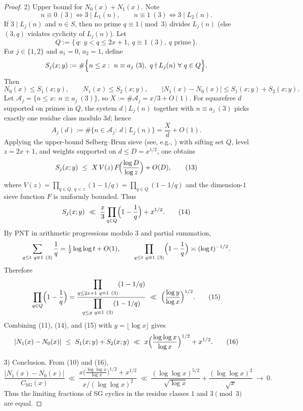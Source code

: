 \begin{proof}
2) Upper bound for $N_0(x)+N_1(x)$. Note
$$n\equiv0\ (3)\iff 3\mid L_1(n),\qquad n\equiv1\ (3)\iff 3\mid L_2(n).$$
If $3\mid L_j(n)$ and $n\in S$, then no prime $q\equiv1\pmod3$ divides $L_j(n)$ (else $(3,q)$ violates cyclicity of $L_j(n)$). Let
$$Q:=\{\,q:\ y<q\le 2x+1,\ q\equiv1\ (3),\ q\text{ prime}\,\}.$$
For $j\in\{1,2\}$ and $a_1=0$, $a_2=1$, define
$$S_j(x;y):=\#\Bigl\{n\le x:\ n\equiv a_j\ (3),\ q\nmid L_j(n)\ \forall\ q\in Q\Bigr\}.$$
Then
$$N_0(x)\le S_1(x;y),\qquad N_1(x)\le S_2(x;y),\qquad |N_1(x)-N_0(x)|\le S_1(x;y)+S_2(x;y).\tag{11}$$
Let $\mathcal A_j=\{n\le x:\ n\equiv a_j\ (3)\}$, so $X:=\#\mathcal A_j=x/3+O(1)$. For squarefree $d$ supported on primes in $Q$, the system $d\mid L_j(n)$ together with $n\equiv a_j\ (3)$ picks exactly one residue class modulo $3d$; hence
$$A_j(d):=\#\{n\in\mathcal A_j:\ d\mid L_j(n)\}=\frac{X}{d}+O(1).\tag{12}$$
Applying the upper-bound Selberg--Brun sieve (see, e.g., \cite{HalRich1974,IK2004}) with sifting set $Q$, level $z=2x+1$, and weights supported on $d\le D=x^{1/2}$, one obtains
$$S_j(x;y)\ \le\ X\,V(z)\,F\!\Bigl(\frac{\log D}{\log z}\Bigr)+O(D),\tag{13}$$
where $V(z)=\prod_{q\in Q,\ q<z}(1-1/q)=\prod_{q\in Q}(1-1/q)$ and the dimension-$1$ sieve function $F$ is uniformly bounded. Thus
$$S_j(x;y)\ \ll\ \frac{x}{3}\prod_{q\in Q}\Bigl(1-\frac1q\Bigr)+x^{1/2}.\tag{14}$$
By PNT in arithmetic progressions modulo $3$ and partial summation,
$$\sum_{\substack{q\le t\ q\equiv1\ (3)}}\frac1q=\tfrac12\log\log t+O(1),\qquad \prod_{\substack{q\le t\ q\equiv1\ (3)}}\Bigl(1-\frac1q\Bigr)\asymp (\log t)^{-1/2}.$$
Therefore
$$\prod_{q\in Q}\Bigl(1-\frac1q\Bigr)=\frac{\displaystyle\prod_{\substack{q\le 2x+1\ q\equiv1\ (3)}}(1-1/q)}{\displaystyle\prod_{\substack{q\le y\ q\equiv1\ (3)}}(1-1/q)}\ \ll\ \Bigl(\frac{\log y}{\log x}\Bigr)^{1/2}.\tag{15}$$
Combining (11), (14), and (15) with $y=\lfloor\log x\rfloor$ gives
$$|N_1(x)-N_0(x)|\ \le\ S_1(x;y)+S_2(x;y)\ \ll\ x\Bigl(\frac{\log\log x}{\log x}\Bigr)^{1/2}+x^{1/2}.\tag{16}$$

3) Conclusion. From (10) and (16),
$$\frac{|N_1(x)-N_0(x)|}{C_{\mathrm{SG}}(x)}\ \ll\ \frac{x\bigl(\tfrac{\log\log x}{\log x}\bigr)^{1/2}+x^{1/2}}{x/(\log\log x)^2}\ \ll\ \frac{(\log\log x)^{5/2}}{\sqrt{\log x}}+\frac{(\log\log x)^2}{\sqrt{x}}\ \to\ 0.$$
Thus the limiting fractions of SG cyclics in the residue classes $1$ and $3\pmod3$ are equal. 
\end{proof}
